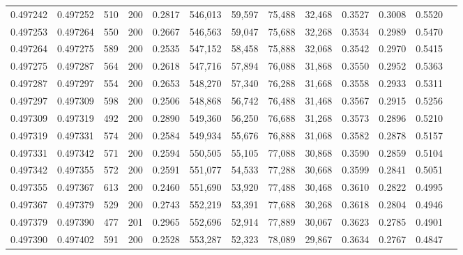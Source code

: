 \begin{tabular}{rrrrrrrrrrrrr}
0.497242 & 0.497252 &   510 & 200 &                                     0.2817 & 546,013 &  59,597 &  75,488 &  32,468 & 0.3527 & 0.3008 & 0.5520 \\
0.497253 & 0.497264 &   550 & 200 &                                     0.2667 & 546,563 &  59,047 &  75,688 &  32,268 & 0.3534 & 0.2989 & 0.5470 \\
0.497264 & 0.497275 &   589 & 200 &                                     0.2535 & 547,152 &  58,458 &  75,888 &  32,068 & 0.3542 & 0.2970 & 0.5415 \\
0.497275 & 0.497287 &   564 & 200 &                                     0.2618 & 547,716 &  57,894 &  76,088 &  31,868 & 0.3550 & 0.2952 & 0.5363 \\
0.497287 & 0.497297 &   554 & 200 &                                     0.2653 & 548,270 &  57,340 &  76,288 &  31,668 & 0.3558 & 0.2933 & 0.5311 \\
0.497297 & 0.497309 &   598 & 200 &                                     0.2506 & 548,868 &  56,742 &  76,488 &  31,468 & 0.3567 & 0.2915 & 0.5256 \\
0.497309 & 0.497319 &   492 & 200 &                                     0.2890 & 549,360 &  56,250 &  76,688 &  31,268 & 0.3573 & 0.2896 & 0.5210 \\
0.497319 & 0.497331 &   574 & 200 &                                     0.2584 & 549,934 &  55,676 &  76,888 &  31,068 & 0.3582 & 0.2878 & 0.5157 \\
0.497331 & 0.497342 &   571 & 200 &                                     0.2594 & 550,505 &  55,105 &  77,088 &  30,868 & 0.3590 & 0.2859 & 0.5104 \\
0.497342 & 0.497355 &   572 & 200 &                                     0.2591 & 551,077 &  54,533 &  77,288 &  30,668 & 0.3599 & 0.2841 & 0.5051 \\
0.497355 & 0.497367 &   613 & 200 &                                     0.2460 & 551,690 &  53,920 &  77,488 &  30,468 & 0.3610 & 0.2822 & 0.4995 \\
0.497367 & 0.497379 &   529 & 200 &                                     0.2743 & 552,219 &  53,391 &  77,688 &  30,268 & 0.3618 & 0.2804 & 0.4946 \\
0.497379 & 0.497390 &   477 & 201 &                                     0.2965 & 552,696 &  52,914 &  77,889 &  30,067 & 0.3623 & 0.2785 & 0.4901 \\
0.497390 & 0.497402 &   591 & 200 &                                     0.2528 & 553,287 &  52,323 &  78,089 &  29,867 & 0.3634 & 0.2767 & 0.4847 \\

\end{tabular}
